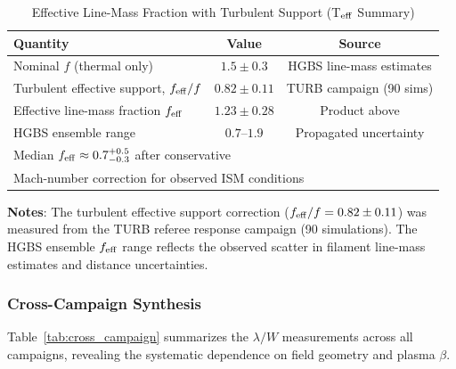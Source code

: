 \documentclass[twoside,twocolumn]{mnras}
\begin{document}
\begin{table}
\caption{Effective Line-Mass Fraction with Turbulent Support (T$_{\rm eff}$ Summary)}
\label{tab:feff}
\small
\begin{tabular}{lcc}
\toprule
Quantity & Value & Source \\
\midrule
Nominal $f$ (thermal only) & $1.5 \pm 0.3$ & HGBS line-mass estimates \\
Turbulent effective support, $f_{\rm eff}/f$ & $0.82 \pm 0.11$ & TURB campaign (90 sims) \\
Effective line-mass fraction $f_{\rm eff}$ & $1.23 \pm 0.28$ & Product above \\
HGBS ensemble range & $0.7$--$1.9$ & Propagated uncertainty \\
\midrule
\multicolumn{3}{l}{\footnotesize Median $f_{\rm eff} \approx 0.7^{+0.5}_{-0.3}$ after conservative}\\
\multicolumn{3}{l}{\footnotesize Mach-number correction for observed ISM conditions}\\
\bottomrule
\end{tabular}
\vspace{0.05in}
\footnotesize
\textbf{Notes}: The turbulent effective support correction ($f_{\rm eff}/f = 0.82 \pm 0.11$) was measured from the TURB referee response campaign (90 simulations). The HGBS ensemble $f_{\rm eff}$ range reflects the observed scatter in filament line-mass estimates and distance uncertainties.
\end{table}

\subsubsection{Cross-Campaign Synthesis}

Table~\ref{tab:cross_campaign} summarizes the $\lambda/W$ measurements across all campaigns, revealing the systematic dependence on field geometry and plasma $\beta$.
\end{document}
